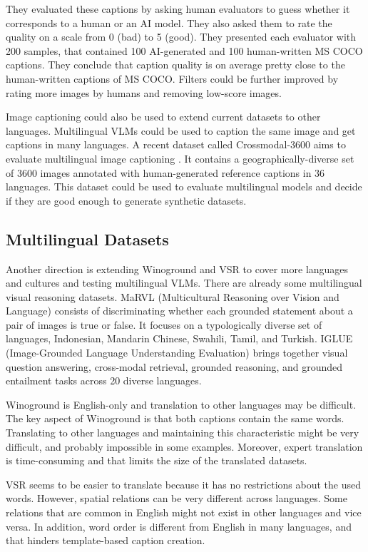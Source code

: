 They evaluated these captions by asking human evaluators to guess whether it corresponds to a human or an AI model. They also asked them to rate the quality on a scale from 0 (bad) to 5 (good). They presented each evaluator with 200 samples, that contained 100 AI-generated and 100 human-written MS COCO captions. They conclude that caption quality is on average pretty close to the human-written captions of MS COCO. Filters could be further improved by rating more images by humans and removing low-score images.

Image captioning could also be used to extend current datasets to other languages. Multilingual VLMs could be used to caption the same image and get captions in many languages. A recent dataset called Crossmodal-3600 aims to evaluate multilingual image captioning \cite{thapliyal2022crossmodal}. It contains a geographically-diverse set of 3600 images annotated with human-generated reference captions in 36 languages. This dataset could be used to evaluate multilingual models and decide if they are good enough to generate synthetic datasets.

\subsection{Multilingual Datasets}

Another direction is extending Winoground and VSR to cover more languages and cultures and testing multilingual VLMs. There are already some multilingual visual reasoning datasets. MaRVL (Multicultural Reasoning over Vision and Language) \cite{liu-etal-2021-visually} consists of discriminating whether each grounded statement about a pair of images is true or false. It focuses on a typologically diverse set of languages, Indonesian, Mandarin Chinese, Swahili, Tamil, and Turkish. IGLUE (Image-Grounded Language Understanding Evaluation) \cite{bugliarello2022iglue} brings together visual question answering, cross-modal retrieval, grounded reasoning, and grounded entailment tasks across 20 diverse languages.

Winoground is English-only and translation to other languages may be difficult. The key aspect of Winoground is that both captions contain the same words. Translating to other languages and maintaining this characteristic might be very difficult, and probably impossible in some examples. Moreover, expert translation is time-consuming and that limits the size of the translated datasets. 

VSR seems to be easier to translate because it has no restrictions about the used words. However, spatial relations can be very different across languages. Some relations that are common in English might not exist in other languages and vice versa. In addition, word order is different from English in many languages, and that hinders template-based caption creation.

